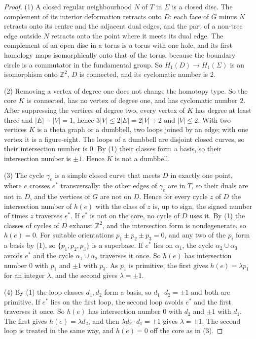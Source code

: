 \documentclass[11pt]{amsart}
\theoremstyle{definition}
\theoremstyle{remark}
\newcommand{\Z}{\mathbb{Z}}
\begin{document}
\begin{proof}
(1) A closed regular neighbourhood $N$ of $T$ in $\Sigma$ is a closed disc. The complement of its interior deformation
retracts onto $D$: each face of $G$ minus $N$ retracts onto its centre and the adjacent dual edges, and the part of a
non-tree edge outside $N$ retracts onto the point where it meets its dual edge. The complement of an open disc in a
torus is a torus with one hole, and its first homology maps isomorphically onto that of the torus, because the
boundary circle is a commutator in the fundamental group. So $H_1(D)\to H_1(\Sigma)$ is an isomorphism onto $\Z^2$,
$D$ is connected, and its cyclomatic number is $2$.

(2) Removing a vertex of degree one does not change the homotopy type. So the core $K$ is connected, has no vertex of
degree one, and has cyclomatic number $2$. After suppressing the vertices of degree two, every vertex of $K$ has
degree at least three and $|E|-|V|=1$, hence $3|V|\le2|E|=2|V|+2$ and $|V|\le2$. With two vertices $K$ is a theta
graph or a dumbbell, two loops joined by an edge; with one vertex it is a figure-eight. The loops of a dumbbell are
disjoint closed curves, so their intersection number is $0$. By (1) their classes form a basis, so their intersection
number is $\pm1$. Hence $K$ is not a dumbbell.

(3) The cycle $\gamma_e$ is a simple closed curve that meets $D$ in exactly one point, where $e$ crosses $e^*$
transversally: the other edges of $\gamma_e$ are in $T$, so their duals are not in $D$, and the vertices of $G$ are
not on $D$. Hence for every cycle $z$ of $D$ the intersection number of $h(e)$ with the class of $z$ is, up to sign,
the signed number of times $z$ traverses $e^*$. If $e^*$ is not on the core, no cycle of $D$ uses it. By (1) the
classes of cycles of $D$ exhaust $\Z^2$, and the intersection form is nondegenerate, so $h(e)=0$. For suitable
orientations $p_1\pm p_2\pm p_3=0$, and any two of the $p_i$ form a basis by (1), so $\{p_1,p_2,p_3\}$ is a superbase.
If $e^*$ lies on $\alpha_1$, the cycle $\alpha_2\cup\alpha_3$ avoids $e^*$ and the cycle $\alpha_1\cup\alpha_2$
traverses it once. So $h(e)$ has intersection number $0$ with $p_1$ and $\pm1$ with $p_3$. As $p_1$ is primitive, the
first gives $h(e)=\lambda p_1$ for an integer $\lambda$, and the second gives $\lambda=\pm1$.

(4) By (1) the loop classes $d_1,d_2$ form a basis, so $d_1\cdot d_2=\pm1$ and both are primitive. If $e^*$ lies on the
first loop, the second loop avoids $e^*$ and the first traverses it once. So $h(e)$ has intersection number $0$ with
$d_2$ and $\pm1$ with $d_1$. The first gives $h(e)=\lambda d_2$, and then $\lambda d_2\cdot d_1=\pm1$ gives
$\lambda=\pm1$. The second loop is treated in the same way, and $h(e)=0$ off the core as in (3).
\end{proof}
\end{document}
